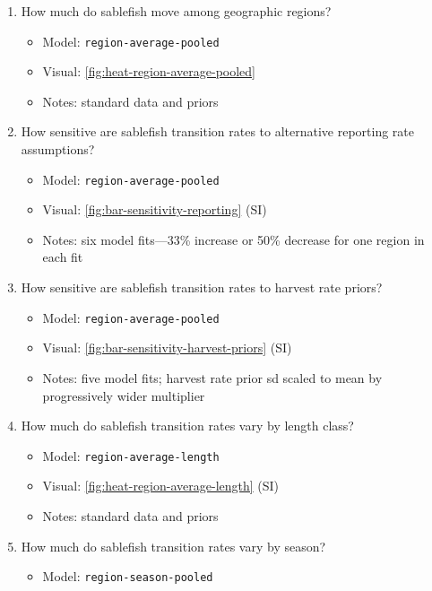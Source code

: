 \documentclass{article}
\begin{document}
\begin{enumerate}
    \item How much do sablefish move among geographic regions? 
        \begin{itemize}
            \item Model: \texttt{region-average-pooled}
            \item Visual: \autoref{fig:heat-region-average-pooled}
            \item Notes: standard data and priors
        \end{itemize}
    \item How sensitive are sablefish transition rates to alternative reporting rate assumptions?
        \begin{itemize}
            \item Model: \texttt{region-average-pooled}
            \item Visual: \autoref{fig:bar-sensitivity-reporting} (SI)
            \item Notes: six model fits---33\% increase or 50\% decrease for one region in each fit
        \end{itemize}
    \item How sensitive are sablefish transition rates to harvest rate priors?
        \begin{itemize}
            \item Model: \texttt{region-average-pooled}
            \item Visual: \autoref{fig:bar-sensitivity-harvest-priors} (SI)
            \item Notes: five model fits; harvest rate prior sd scaled to mean by progressively wider multiplier
        \end{itemize}    
    \item How much do sablefish transition rates vary by length class?
        \begin{itemize}
            \item Model: \texttt{region-average-length}
            \item Visual: \autoref{fig:heat-region-average-length} (SI)
            \item Notes: standard data and priors
        \end{itemize}    
    \item How much do sablefish transition rates vary by season?
        \begin{itemize}
            \item Model: \texttt{region-season-pooled}

\end{itemize}
\end{enumerate}
\end{document}
